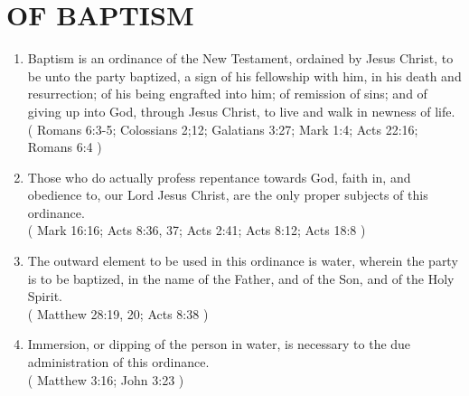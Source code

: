 \documentclass[12pt,a4paper]{book}
\begin{document}
\chapter{OF BAPTISM}
\label{ch-bap}
\begin{enumerate}
\item
\label{ch-bap-1}
Baptism is an ordinance of the New Testament, ordained by Jesus Christ, to be unto the party baptized, a sign of his fellowship with him, in his death and resurrection; of his being engrafted into him; of remission of sins; and of giving up into God, through Jesus Christ, to live and walk in newness of life.\\
( Romans 6:3-5; Colossians 2;12; Galatians 3:27; Mark 1:4; Acts 22:16; Romans 6:4 )
\item
\label{ch-bap-2}
Those who do actually profess repentance towards God, faith in, and obedience to, our Lord Jesus Christ, are the only proper subjects of this ordinance.\\
( Mark 16:16; Acts 8:36, 37; Acts 2:41; Acts 8:12; Acts 18:8 )
\item
\label{ch-bap-3}
The outward element to be used in this ordinance is water, wherein the party is to be baptized, in the name of the Father, and of the Son, and of the Holy Spirit.\\
( Matthew 28:19, 20; Acts 8:38 )
\item
\label{ch-bap-4}
Immersion, or dipping of the person in water, is necessary to the due administration of this ordinance.\\
( Matthew 3:16; John 3:23 )
\end{enumerate}
\end{document}
